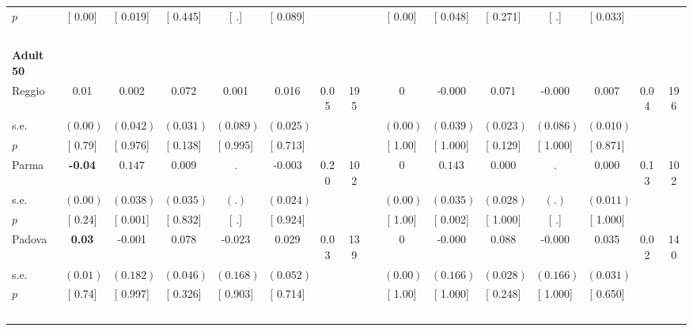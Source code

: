 \begin{longtable}{L{8em} c c c c c c c p{1em} c c c c c c c}
\quad \quad \quad \quad $ p$ & [     0.00] & [    0.019] & [    0.445] & [        .] & [    0.089] & & & & [     0.00] & [    0.048] & [    0.271] & [        .] & [    0.033] & &  \\[1em]
~\\[1em]
\quad \quad \textbf{Adult 50} & & & & & & & & & & & & & & & \\* 
\quad \quad \quad Reggio& 0.01 &     0.002 &     0.072 &     0.001 &     0.016 &      0.05 &       195 & & 0 &    -0.000 &     0.071 &    -0.000 &     0.007 &      0.04 &       196  \\*
\quad \quad \quad \quad s.e.& $ (     0.00)$ & $ (    0.042)$ & $ (    0.031)$ & $ (    0.089)$ & $ (    0.025)$ & & & & $ (     0.00)$ & $ (    0.039)$ & $ (    0.023)$ & $ (    0.086)$ & $ (    0.010)$ & &  \\*
\quad \quad \quad \quad $ p$ & [     0.79] & [    0.976] & [    0.138] & [    0.995] & [    0.713] & & & & [     1.00] & [    1.000] & [    0.129] & [    1.000] & [    0.871] & &  \\[1em]
\quad \quad \quad Parma& \textbf{    -0.04} & $ \mathbf{    0.147}$ &     0.009 &         . &    -0.003 &      0.20 &       102 & & 0 & $ \mathbf{    0.143}$ &     0.000 &         . &     0.000 &      0.13 &       102  \\*
\quad \quad \quad \quad s.e.& $ (     0.00)$ & $ (    0.038)$ & $ (    0.035)$ & $ (        .)$ & $ (    0.024)$ & & & & $ (     0.00)$ & $ (    0.035)$ & $ (    0.028)$ & $ (        .)$ & $ (    0.011)$ & &  \\*
\quad \quad \quad \quad $ p$ & [     0.24] & [    0.001] & [    0.832] & [        .] & [    0.924] & & & & [     1.00] & [    0.002] & [    1.000] & [        .] & [    1.000] & &  \\[1em]
\quad \quad \quad Padova& \textbf{     0.03} &    -0.001 &     0.078 &    -0.023 &     0.029 &      0.03 &       139 & & 0 &    -0.000 &     0.088 &    -0.000 &     0.035 &      0.02 &       140  \\*
\quad \quad \quad \quad s.e.& $ (     0.01)$ & $ (    0.182)$ & $ (    0.046)$ & $ (    0.168)$ & $ (    0.052)$ & & & & $ (     0.00)$ & $ (    0.166)$ & $ (    0.028)$ & $ (    0.166)$ & $ (    0.031)$ & &  \\*
\quad \quad \quad \quad $ p$ & [     0.74] & [    0.997] & [    0.326] & [    0.903] & [    0.714] & & & & [     1.00] & [    1.000] & [    0.248] & [    1.000] & [    0.650] & &  \\[1em]
~\\[1em]
\end{longtable}